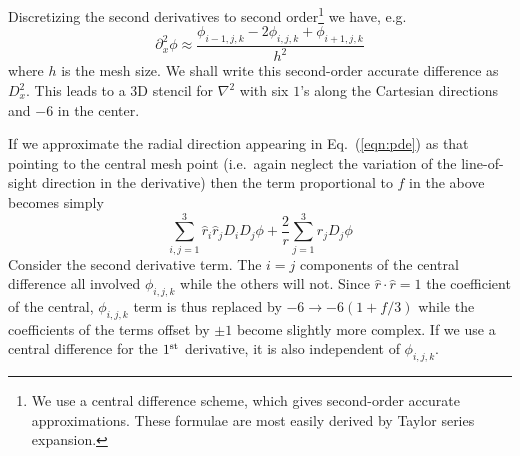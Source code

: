 \documentclass[a4paper,11pt]{article}
\begin{document}
Discretizing the second derivatives to second order\footnote{We use a central
difference scheme, which gives second-order accurate approximations.  These
formulae are most easily derived by Taylor series expansion.} 
we have, e.g.
\begin{equation}
  \partial_x^2\phi \approx \frac{\phi_{i-1,j,k}-2\phi_{i,j,k}+\phi_{i+1,j,k}}
  {h^2}
\end{equation}
where $h$ is the mesh size.  We shall write this second-order accurate
difference as $D_x^2$.  This leads to a 3D stencil for $\nabla^2$ with
six $1$'s along the Cartesian directions and $-6$ in the center.

If we approximate the radial direction appearing in Eq.~(\ref{eqn:pde})
as that pointing to the central mesh point (i.e.~again neglect the variation
of the line-of-sight direction in the derivative) then the term proportional
to $f$ in the above becomes simply
\begin{equation}
  \sum_{i,j=1}^3 \hat{r}_i\hat{r}_j D_iD_j \phi
  + \frac{2}{r}\sum_{j=1}^3 \hat{r}_jD_j\phi
\label{eqn:ffinite}
\end{equation}
Consider the second derivative term.
The $i=j$ components of the central difference all involved $\phi_{i,j,k}$
while the others will not.  Since $\hat{r}\cdot\hat{r}=1$ the coefficient
of the central, $\phi_{i,j,k}$ term is thus replaced by $-6\to -6(1+f/3)$
while the coefficients of the terms offset by $\pm 1$ become slightly more
complex.  If we use a central difference for the $1^{\rm st}$ derivative,
it is also independent of $\phi_{i,j,k}$.
\end{document}
